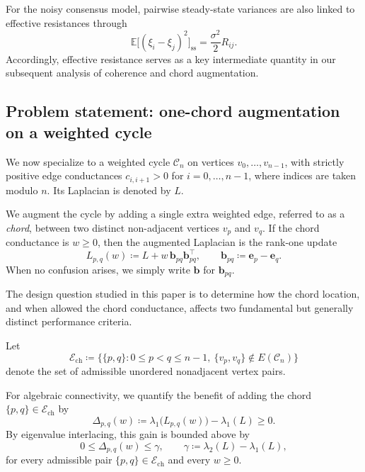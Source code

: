 \documentclass[11pt]{article}
\numberwithin{equation}{section}
\theoremstyle{definition}
\theoremstyle{remark}
\begin{document}
For the noisy consensus model, pairwise steady-state variances are also
linked to effective resistances through
\begin{equation}\label{eq:var_resistance}
	\mathbb{E}\bigl[(\xi_i-\xi_j)^2\bigr]_{\mathrm{ss}}
	=
	\frac{\sigma^2}{2}R_{ij}.
\end{equation}
Accordingly, effective resistance serves as a key intermediate quantity in
our subsequent analysis of coherence and chord augmentation.

\subsection{Problem statement: one-chord augmentation on a weighted cycle}

We now specialize to a weighted cycle
$\mathcal{C}_n$ on vertices $v_0,\dots,v_{n-1}$, with strictly positive edge
conductances $c_{i,i+1}>0$ for $i=0,\dots,n-1$, where indices are taken
modulo $n$.
Its Laplacian is denoted by $L$.

We augment the cycle by adding a single extra weighted edge, referred to as
a \emph{chord}, between two distinct non-adjacent vertices $v_p$ and $v_q$.
If the chord conductance is $w\ge 0$, then the augmented Laplacian is the
rank-one update
\begin{equation}\label{eq:chord_update}
	L_{p,q}(w)
	\coloneqq
	L+w\,\boldsymbol{b}_{pq}\boldsymbol{b}_{pq}^\top,
	\qquad
	\boldsymbol{b}_{pq}\coloneqq \boldsymbol{e}_p-\boldsymbol{e}_q.
\end{equation}
When no confusion arises, we simply write $\boldsymbol{b}$ for
$\boldsymbol{b}_{pq}$.

The design question studied in this paper is to determine how the chord
location, and when allowed the chord conductance, affects two fundamental
but generally distinct performance criteria.

Let
\begin{equation}\label{eq:feasible_chord_set}
	\mathcal{E}_{\mathrm{ch}}
	\coloneqq
	\bigl\{\{p,q\}:0\le p<q\le n-1,\ \{v_p,v_q\}\notin E(\mathcal C_n)\bigr\}
\end{equation}
denote the set of admissible unordered nonadjacent vertex pairs.

For algebraic connectivity, we quantify the benefit of adding the chord
$\{p,q\}\in\mathcal{E}_{\mathrm{ch}}$ by
\begin{equation}\label{eq:delta_pq_def}
	\Delta_{p,q}(w)
	\coloneqq
	\lambda_1\bigl(L_{p,q}(w)\bigr)-\lambda_1(L)\ge 0.
\end{equation}
By eigenvalue interlacing, this gain is bounded above by
\begin{equation}\label{eq:interlacing_ceiling_problem}
	0\le \Delta_{p,q}(w)\le
	\gamma,
	\qquad
	\gamma\coloneqq \lambda_2(L)-\lambda_1(L),
\end{equation}
for every admissible pair $\{p,q\}\in\mathcal{E}_{\mathrm{ch}}$ and every $w\ge0$.
\end{document}
